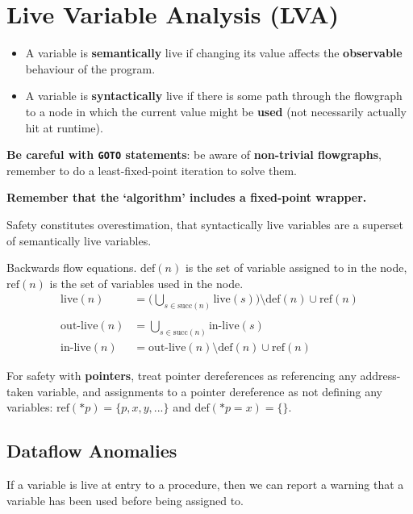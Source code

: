 \documentclass[a4paper, 11pt]{article}
\begin{document}
\section*{Live Variable Analysis (LVA)}
{
    \begin{itemize}
    \item A variable is \textbf{semantically} live if changing its value affects the \textbf{observable} behaviour of the program.
    \item A variable is \textbf{syntactically} live if there is some path through the flowgraph to a node in which the current value might be \textbf{used} (not necessarily actually hit at runtime).
    \end{itemize}

    \textbf{Be careful with \texttt{GOTO} statements}: be aware of \textbf{non-trivial flowgraphs}, remember to do a least-fixed-point iteration to solve them.

    \textbf{Remember that the `algorithm' includes a fixed-point wrapper.}

    Safety constitutes overestimation, that syntactically live variables are a superset of semantically live variables.

    Backwards flow equations. \(\text{def}(n)\) is the set of variable assigned to in the node, \(\text{ref}(n)\) is the set of variables used in the node.
    \begin{align*}
    \text{live}(n) &= \bigg(\bigcup_{s \in \text{succ}(n)}{\text{live}(s)}\bigg) \setminus \text{def}(n) \cup \text{ref}(n) \\\\
    \text{out-live}(n) &= \bigcup_{s \in \text{succ}(n)}{\text{in-live}(s)} \\
    \text{in-live}(n) &= \text{out-live}(n) \setminus \text{def}(n) \cup \text{ref}(n)
    \end{align*}

    For safety with \textbf{pointers}, treat pointer dereferences as referencing any address-taken variable, and assignments to a pointer dereference as not defining any variables: \(\text{ref}(*p) = \{p, x, y, ...\}\) and \(\text{def}(*p = x) = \{\}\).

    \subsection*{Dataflow Anomalies}
    {
        If a variable is live at entry to a procedure, then we can report a warning that a variable has been used before being assigned to.

}}
\end{document}
